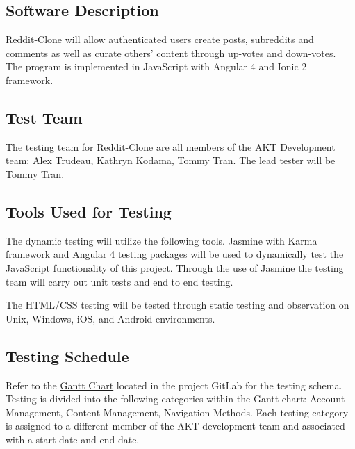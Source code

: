 \documentclass[12pt,fleqn]{article}
\begin{document}
\subsection {Software Description}
Reddit-Clone will allow authenticated users create posts, subreddits and comments as well as curate others' content through up-votes and down-votes.  The program is implemented in JavaScript with Angular 4 and Ionic 2 framework.

\subsection {Test Team}
The testing team for Reddit-Clone are all members of the AKT Development team: Alex Trudeau, Kathryn Kodama, Tommy Tran.  The lead tester will be Tommy Tran.

\subsection {Tools Used for Testing}
The dynamic testing will utilize the following tools.  Jasmine with Karma framework and Angular 4 testing packages will be used to dynamically test the JavaScript functionality of this project.  Through the use of Jasmine the testing team will carry out unit tests and end to end testing.

The HTML/CSS testing will be tested through static testing and observation on Unix, Windows, iOS, and Android environments.

\subsection {Testing Schedule}

Refer to the \href{https://gitlab.cas.mcmaster.ca/trudeaua/reddit-clone}{Gantt Chart} located in the project GitLab for the testing schema.   Testing is divided into the following categories within the Gantt chart: Account Management, Content Management, Navigation Methods.  Each testing category is assigned to a different member of the AKT development team and associated with a start date and end date.
\end{document}
